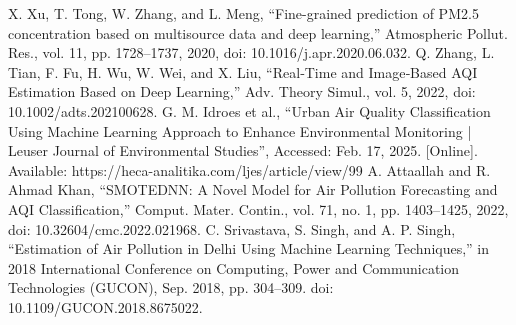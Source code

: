 \documentclass[conference]{IEEEtran}
\begin{document}
\begin{thebibliography}{00}
 X. Xu, T. Tong, W. Zhang, and L. Meng, “Fine-grained prediction of PM2.5 concentration based on multisource data and deep learning,” Atmospheric Pollut. Res., vol. 11, pp. 1728–1737, 2020, doi: 10.1016/j.apr.2020.06.032.
 Q. Zhang, L. Tian, F. Fu, H. Wu, W. Wei, and X. Liu, “Real‐Time and Image‐Based AQI Estimation Based on Deep Learning,” Adv. Theory Simul., vol. 5, 2022, doi: 10.1002/adts.202100628.
 G. M. Idroes et al., “Urban Air Quality Classification Using Machine Learning Approach to Enhance Environmental Monitoring | Leuser Journal of Environmental Studies”, Accessed: Feb. 17, 2025. [Online]. Available: https://heca-analitika.com/ljes/article/view/99
 A. Attaallah and R. Ahmad Khan, “SMOTEDNN: A Novel Model for Air Pollution Forecasting and AQI Classification,” Comput. Mater. Contin., vol. 71, no. 1, pp. 1403–1425, 2022, doi: 10.32604/cmc.2022.021968.
 C. Srivastava, S. Singh, and A. P. Singh, “Estimation of Air Pollution in Delhi Using Machine Learning Techniques,” in 2018 International Conference on Computing, Power and Communication Technologies (GUCON), Sep. 2018, pp. 304–309. doi: 10.1109/GUCON.2018.8675022.
\end{thebibliography}
\end{document}
